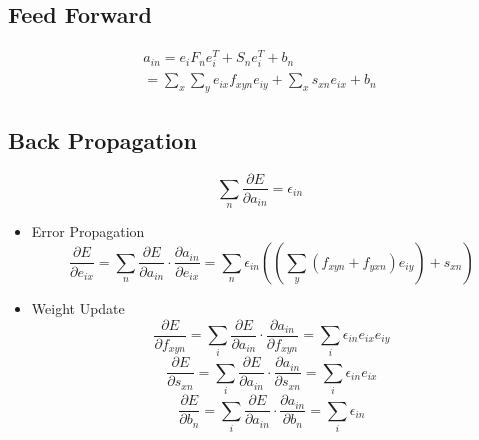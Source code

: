 \documentclass[12pt]{article}
\begin{document}
    \subsection{Feed Forward}
    \begin{equation}
    \begin{array}{l}
    a_{in} = e_iF_ne_i^T + S_ne_i^T + b_n \\
    = \sum_x \sum_y e_{ix}f_{xyn}e_{iy} + \sum_x s_{xn}e_{ix} + b_n
    \end{array}
    \end{equation}

    \subsection{Back Propagation}
    \begin{equation}
    \sum_n \frac{\partial E}{\partial a_{in}} = \epsilon_{in}
    \end{equation}
    \begin{itemize}
        \item Error Propagation
        \begin{equation}
        \frac{\partial E}{\partial e_{ix}} = \sum_n \frac{\partial E}{\partial a_{in}} \cdot \frac{\partial a_{in}}{\partial e_{ix}} = \sum_n  \epsilon_{in} ((\sum_y (f_{xyn} + f_{yxn}) e_{iy}) + s_{xn})
        \end{equation}
        
        \item Weight Update
        \begin{equation}
        \frac{\partial E}{\partial f_{xyn}} = \sum_i \frac{\partial E}{\partial a_{in}} \cdot \frac{\partial a_{in}}{\partial f_{xyn}} = \sum_i  \epsilon_{in} e_{ix} e_{iy}
        \end{equation}
        \begin{equation}
        \frac{\partial E}{\partial s_{xn}} = \sum_i \frac{\partial E}{\partial a_{in}} \cdot \frac{\partial a_{in}}{\partial s_{xn}} = \sum_i  \epsilon_{in} e_{ix}
        \end{equation}
        \begin{equation}
        \frac{\partial E}{\partial b_n} = \sum_i \frac{\partial E}{\partial a_{in}} \cdot \frac{\partial a_{in}}{\partial b_n} = \sum_i  \epsilon_{in}
        \end{equation}
    \end{itemize}
    
\end{document}
